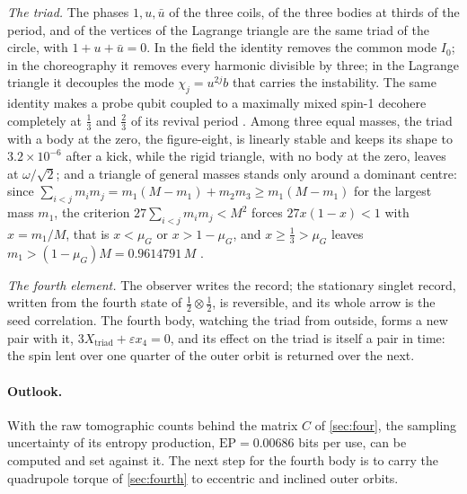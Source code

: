 \documentclass[11pt]{article}
\theoremstyle{definition}\newtheorem{definition}[theorem]{Definition}
\theoremstyle{remark}\newtheorem{remark}[theorem]{Remark}
\begin{document}
\emph{The triad.} The phases $1,u,\bar u$ of the three coils, of the three bodies at thirds of the period, and of the vertices of the Lagrange triangle are the same triad of the circle, with $1+u+\bar u=0$. In the field the identity removes the common mode $I_0$; in the choreography it removes every harmonic divisible by three; in the Lagrange triangle it decouples the mode $\chi_j=u^{2j}b$ that carries the instability. The same identity makes a probe qubit coupled to a maximally mixed spin-1 decohere completely at $\frac13$ and $\frac23$ of its revival period \cite{SQuant}. Among three equal masses, the triad with a body at the zero, the figure-eight, is linearly stable \cite{Roberts} and keeps its shape to $3.2\times10^{-6}$ after a kick, while the rigid triangle, with no body at the zero, leaves at $\omega/\sqrt2$; and a triangle of general masses stands only around a dominant centre: since $\sum_{i<j}m_im_j=m_1(M-m_1)+m_2m_3\ge m_1(M-m_1)$ for the largest mass $m_1$, the criterion $27\sum_{i<j}m_im_j<M^2$ forces $27x(1-x)<1$ with $x=m_1/M$, that is $x<\mu_G$ or $x>1-\mu_G$, and $x\ge\frac13>\mu_G$ leaves $m_1>(1-\mu_G)M=0.9614791\,M$ \cite{Gascheau,Routh,SPlanet}.

\emph{The fourth element.} The observer writes the record; the stationary singlet record, written from the fourth state of $\frac12\otimes\frac12$, is reversible, and its whole arrow is the seed correlation. The fourth body, watching the triad from outside, forms a new pair with it, $3X_{\mathrm{triad}}+\varepsilon x_4=0$, and its effect on the triad is itself a pair in time: the spin lent over one quarter of the outer orbit is returned over the next.

\paragraph{Outlook.} With the raw tomographic counts behind the matrix $C$ of \cref{sec:four}, the sampling uncertainty of its entropy production, $\mathrm{EP}=0.00686$ bits per use, can be computed and set against it. The next step for the fourth body is to carry the quadrupole torque of \cref{sec:fourth} to eccentric and inclined outer orbits.
\end{document}

